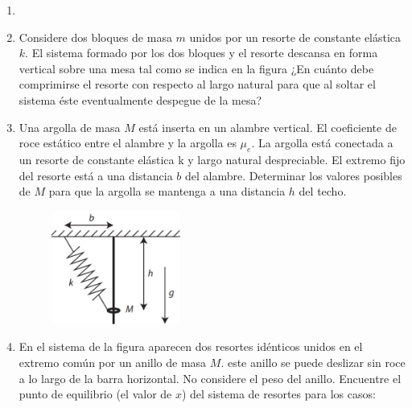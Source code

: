 \documentclass[letterpaper,11pt]{article}
\begin{document}
\vspace{-1cm}
\begin{enumerate}\setlength{\itemsep}{0.4cm}

\item[]

\item Considere dos bloques de masa $m$ unidos por un resorte de constante elástica $k$. El sistema formado por los dos bloques y el resorte descansa en forma vertical sobre una mesa tal como se indica en la figura ¿En cuánto debe comprimirse el resorte con respecto al largo natural para que al soltar el sistema éste eventualmente despegue de la mesa?

    \begin{figure}[H]
        \centering
        
    \end{figure}
\item
Una argolla de masa $M$ está inserta en un alambre vertical. El coeficiente de roce estático entre el alambre y la argolla es $\mu_e$. La argolla está conectada a un resorte de constante elástica k y largo natural despreciable. El extremo fijo del resorte está a una distancia $b$ del alambre. Determinar los valores posibles de $M$ para que la argolla se mantenga a una distancia $h$ del techo.
        

    \begin{figure}[H]
        \centering
        \includegraphics[width=0.4\textwidth]{2023-1/img/aux_7/Aux 7 - P2.PNG}
    \end{figure}
    
    
\newpage

\item En el sistema de la figura aparecen dos resortes idénticos unidos en el extremo común por un anillo de masa $M$. este anillo se puede deslizar sin roce a lo largo de la barra horizontal. No considere el peso del
anillo. Encuentre el punto de equilibrio (el valor de $x$) del sistema de resortes para los casos:


\end{enumerate}
\end{document}
